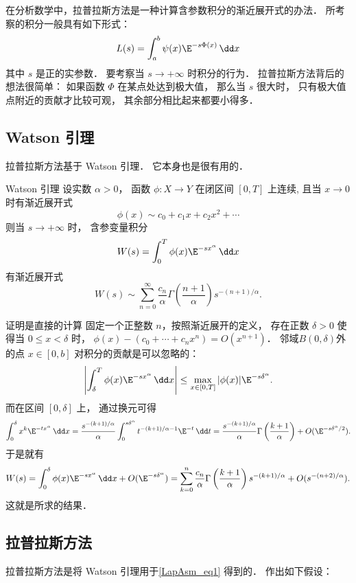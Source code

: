 

在分析数学中，拉普拉斯方法是一种计算含参数积分的渐近展开式的办法． 所考察的积分一般具有如下形式：
\begin{equation}\label{LapAsm_eq1}
L(s)=\int_a^b\psi(x)\E^{-s\Phi(x)}\,\dd x
\end{equation}
其中 $s$ 是正的实参数． 要考察当 $s\to+\infty$ 时积分的行为． 拉普拉斯方法背后的想法很简单： 如果函数 $\Phi$ 在某点处达到极大值， 那么当 $s$ 很大时， 只有极大值点附近的贡献才比较可观， 其余部分相比起来都要小得多．

\subsection{Watson 引理}
拉普拉斯方法基于 Watson 引理． 它本身也是很有用的．

\begin{lemma}{Watson 引理}
设实数 $\alpha>0$， 函数 $\phi:X\to Y$ 在闭区间 $[0,T]$ 上连续, 且当 $x\to0$ 时有渐近展开式
\[
  \phi(x)\sim c_0+c_1x+c_2x^2+\cdots
\]
则当 $s\to+\infty$ 时， 含参变量积分
\[
  W(s)=\int_0^T \phi(x)\E^{-s x^\alpha}\,\dd x
\]
有渐近展开式
\[
  W(s)\sim\sum_{n=0}^\infty \frac{c_n}{\alpha}\Gamma\left(\frac{n+1}{\alpha}\right)s^{-(n+1)/\alpha}.
\]
\end{lemma}

证明是直接的计算 固定一个正整数 $n$，按照渐近展开的定义， 存在正数 $\delta >0$ 使得当 $0\leq x<\delta$ 时， $\phi(x)-(c_0+\cdots+c_nx^n)=O(x^{n+1})$． 邻域$B(0,\delta)$外的点 $x\in[0,b]$ 对积分的贡献是可以忽略的：
\[
  \left|\int_\delta^T\phi(x)\E^{-sx^\alpha}\,\dd x\right|
\leq\max_{x\in[0,T]}|\phi(x)|\E^{-s\delta^\alpha}.
\]
而在区间 $[0,\delta]$ 上， 通过换元可得
\[
  \int_0^\delta x^k\E^{-tx^\alpha}\,\dd x
  =\frac{s^{-(k+1)/\alpha}}{\alpha}\int_0^{s\delta^\alpha}t^{-(k+1)/\alpha-1}\E^{-t}\,\dd t
  =\frac{s^{-(k+1)/\alpha}}{\alpha}\Gamma\left(\frac{k+1}{\alpha}\right)+O(\E^{-s\delta^\alpha/2}).
\]
于是就有
\[
  W(s)
  =\int_0^\delta\phi(x)\E^{-sx^\alpha}\,\dd x+O(\E^{-s\delta^\alpha})
  =\sum_{k=0}^n\frac{c_n}{\alpha}\Gamma\left(\frac{k+1}{\alpha}\right)s^{-(k+1)/\alpha}+O(s^{-(n+2)/\alpha}).
\]
这就是所求的结果．

\subsection{拉普拉斯方法}
拉普拉斯方法是将 Watson 引理用于\autoref{LapAsm_eq1} 得到的． 作出如下假设：

